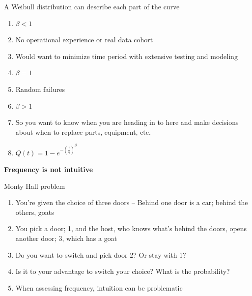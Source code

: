 \documentclass[aspectratio=1610,pdftex,dvipsnames,compress,xcolor={dvipsnames}]{beamer}
\begin{document}
\begin{frame}{A Weibull distribution can describe each part of the curve}
    \begin{enumerate}[series=outerlist,topsep=0pt,itemsep=3pt,leftmargin=*,label=(\arabic*)]
        \item[]$\beta < 1$
        \item[]No operational experience or real data cohort
        \item[]Would want to minimize time period with extensive testing and modeling
            \vspace{0.10in}
        \item[]$\beta = 1$
        \item[]Random failures
            \vspace{0.10in}
        \item[]$\beta > 1$  
        \item[]So you want to know when you are heading in to here and make decisions about when to replace parts, equipment, etc.
            \vspace{0.10in}
        \item[]$Q(t) = 1 - e^{-(\frac{t}{\eta})^{\beta}}$
    \end{enumerate}
\end{frame}


\begin{frame}[plain]{}
    \centering\LARGE\textbf{Frequency is not intuitive}
\end{frame}


\addtocounter{framenumber}{-1}
\begin{frame}{Monty Hall problem}
    \begin{enumerate}[series=outerlist,topsep=0pt,itemsep=15pt,leftmargin=*,label=(\arabic*)]
        \item[]You're given the choice of three doors -- Behind one door is a car; behind the others, goats
        \item[]You pick a door; 1, and the host, who knows what's behind the doors, opens another door; 3, which has a goat
        \item[]Do you want to switch and pick door 2? Or stay with 1?
        \item[]Is it to your advantage to switch your choice? What is the probability?
        \item[]When assessing frequency, intuition can be problematic
    \end{enumerate}
\end{frame}
\end{document}
